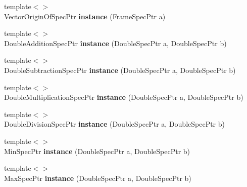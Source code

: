 \begin{DoxyCompactItemize}
\item 
\hypertarget{namespacegiskard__suturo_a35cf46c5313e4cff65e235bc4cbb5ff4}{{\footnotesize template$<$$>$ }\\Vector\-Origin\-Of\-Spec\-Ptr {\bfseries instance} (Frame\-Spec\-Ptr a)}\label{namespacegiskard__suturo_a35cf46c5313e4cff65e235bc4cbb5ff4}

\item 
\hypertarget{namespacegiskard__suturo_a4b199da1a111896739fed07cb7f53fde}{{\footnotesize template$<$$>$ }\\Double\-Addition\-Spec\-Ptr {\bfseries instance} (Double\-Spec\-Ptr a, Double\-Spec\-Ptr b)}\label{namespacegiskard__suturo_a4b199da1a111896739fed07cb7f53fde}

\item 
\hypertarget{namespacegiskard__suturo_a24ccb88d5b403395d5ac6fb7f8d204e6}{{\footnotesize template$<$$>$ }\\Double\-Subtraction\-Spec\-Ptr {\bfseries instance} (Double\-Spec\-Ptr a, Double\-Spec\-Ptr b)}\label{namespacegiskard__suturo_a24ccb88d5b403395d5ac6fb7f8d204e6}

\item 
\hypertarget{namespacegiskard__suturo_a5ba6b6b17fa4a127e0dfb8a3c9113c8e}{{\footnotesize template$<$$>$ }\\Double\-Multiplication\-Spec\-Ptr {\bfseries instance} (Double\-Spec\-Ptr a, Double\-Spec\-Ptr b)}\label{namespacegiskard__suturo_a5ba6b6b17fa4a127e0dfb8a3c9113c8e}

\item 
\hypertarget{namespacegiskard__suturo_a8d4a1e9b2ea38100f9a54b16f3946814}{{\footnotesize template$<$$>$ }\\Double\-Division\-Spec\-Ptr {\bfseries instance} (Double\-Spec\-Ptr a, Double\-Spec\-Ptr b)}\label{namespacegiskard__suturo_a8d4a1e9b2ea38100f9a54b16f3946814}

\item 
\hypertarget{namespacegiskard__suturo_aa9e269a1c7dffe076a07ea8c36f4d3a9}{{\footnotesize template$<$$>$ }\\Min\-Spec\-Ptr {\bfseries instance} (Double\-Spec\-Ptr a, Double\-Spec\-Ptr b)}\label{namespacegiskard__suturo_aa9e269a1c7dffe076a07ea8c36f4d3a9}

\item 
\hypertarget{namespacegiskard__suturo_aec0aa670e7181889a12cefb243200b96}{{\footnotesize template$<$$>$ }\\Max\-Spec\-Ptr {\bfseries instance} (Double\-Spec\-Ptr a, Double\-Spec\-Ptr b)}\label{namespacegiskard__suturo_aec0aa670e7181889a12cefb243200b96}


\end{DoxyCompactItemize}
